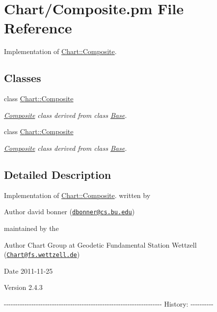 \hypertarget{Composite_8pm}{
\section{Chart/Composite.pm File Reference}
\label{Composite_8pm}
}


Implementation of \hyperlink{classChart_1_1Composite}{Chart::Composite}.  


\subsection*{Classes}
\begin{DoxyCompactItemize}
\item 
class \hyperlink{classChart_1_1Composite}{Chart::Composite}
\begin{DoxyCompactList}\small\item\em \hyperlink{classChart_1_1Composite}{Composite} class derived from class \hyperlink{classChart_1_1Base}{Base}. \item\end{DoxyCompactList}\item 
class \hyperlink{classChart_1_1Composite}{Chart::Composite}
\begin{DoxyCompactList}\small\item\em \hyperlink{classChart_1_1Composite}{Composite} class derived from class \hyperlink{classChart_1_1Base}{Base}. \item\end{DoxyCompactList}\end{DoxyCompactItemize}


\subsection{Detailed Description}
Implementation of \hyperlink{classChart_1_1Composite}{Chart::Composite}. written by \begin{DoxyAuthor}{Author}
david bonner (\href{mailto:dbonner@cs.bu.edu}{\tt dbonner@cs.bu.edu})
\end{DoxyAuthor}
maintained by the \begin{DoxyAuthor}{Author}
Chart Group at Geodetic Fundamental Station Wettzell (\href{mailto:Chart@fs.wettzell.de}{\tt Chart@fs.wettzell.de}) 
\end{DoxyAuthor}
\begin{DoxyDate}{Date}
2011-\/11-\/25 
\end{DoxyDate}
\begin{DoxyVersion}{Version}
2.4.3
\end{DoxyVersion}
-\/-\/-\/-\/-\/-\/-\/-\/-\/-\/-\/-\/-\/-\/-\/-\/-\/-\/-\/-\/-\/-\/-\/-\/-\/-\/-\/-\/-\/-\/-\/-\/-\/-\/-\/-\/-\/-\/-\/-\/-\/-\/-\/-\/-\/-\/-\/-\/-\/-\/-\/-\/-\/-\/-\/-\/-\/-\/-\/-\/-\/-\/-\/-\/-\/-\/-\/-\/-\/ History: -\/-\/-\/-\/-\/-\/-\/-\/-\/-\/ 